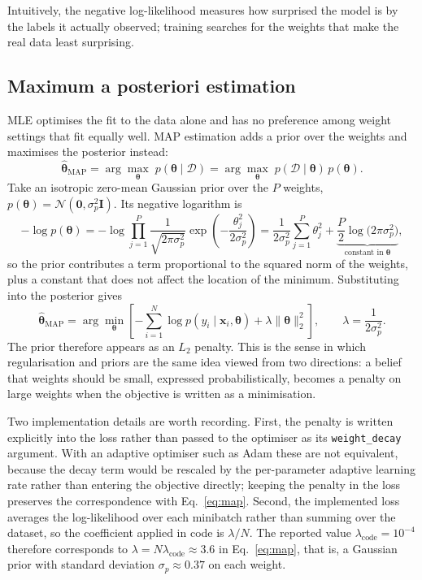 \documentclass{article}
\begin{document}
Intuitively, the negative log-likelihood measures how surprised the model is by
the labels it actually observed; training searches for the weights that make the
real data least surprising.

\subsection{Maximum a posteriori estimation}

MLE optimises the fit to the data alone and has no preference among weight
settings that fit equally well. MAP estimation adds a prior over the weights and
maximises the posterior instead:
\begin{equation}
\hat{\boldsymbol{\theta}}_{\mathrm{MAP}}
= \arg\max_{\boldsymbol{\theta}} \; p(\boldsymbol{\theta} \mid \mathcal{D})
= \arg\max_{\boldsymbol{\theta}} \; p(\mathcal{D} \mid \boldsymbol{\theta})\, p(\boldsymbol{\theta}).
\end{equation}
Take an isotropic zero-mean Gaussian prior over the $P$ weights,
$p(\boldsymbol{\theta}) = \mathcal{N}(\mathbf{0}, \sigma_p^2 \mathbf{I})$. Its
negative logarithm is
\begin{equation}
-\log p(\boldsymbol{\theta})
= -\log \prod_{j=1}^{P} \frac{1}{\sqrt{2\pi\sigma_p^2}}
   \exp\!\left(-\frac{\theta_j^2}{2\sigma_p^2}\right)
= \frac{1}{2\sigma_p^2}\sum_{j=1}^{P}\theta_j^2
  + \underbrace{\frac{P}{2}\log\!\big(2\pi\sigma_p^2\big)}_{\text{constant in }\boldsymbol{\theta}},
\label{eq:prior}
\end{equation}
so the prior contributes a term proportional to the squared norm of the weights,
plus a constant that does not affect the location of the minimum. Substituting
into the posterior gives
\begin{equation}
\hat{\boldsymbol{\theta}}_{\mathrm{MAP}}
= \arg\min_{\boldsymbol{\theta}} \left[
  -\sum_{i=1}^{N} \log p(y_i \mid \mathbf{x}_i, \boldsymbol{\theta})
  + \lambda \lVert \boldsymbol{\theta} \rVert_2^2 \right],
\qquad \lambda = \frac{1}{2\sigma_p^2}.
\label{eq:map}
\end{equation}
The prior therefore appears as an $L_2$ penalty. This is the sense in which
regularisation and priors are the same idea viewed from two directions: a belief
that weights should be small, expressed probabilistically, becomes a penalty on
large weights when the objective is written as a minimisation.

Two implementation details are worth recording. First, the penalty is written
explicitly into the loss rather than passed to the optimiser as its
\texttt{weight\_decay} argument. With an adaptive optimiser such as Adam these
are not equivalent, because the decay term would be rescaled by the per-parameter
adaptive learning rate rather than entering the objective directly; keeping the
penalty in the loss preserves the correspondence with Eq.~\eqref{eq:map}.
Second, the implemented loss averages the log-likelihood over each minibatch
rather than summing over the dataset, so the coefficient applied in code is
$\lambda/N$. The reported value $\lambda_{\text{code}} = 10^{-4}$ therefore
corresponds to $\lambda = N \lambda_{\text{code}} \approx 3.6$ in
Eq.~\eqref{eq:map}, that is, a Gaussian prior with standard deviation
$\sigma_p \approx 0.37$ on each weight.
\end{document}
